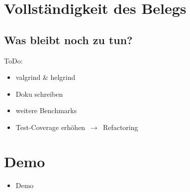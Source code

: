 \documentclass{beamer}
\begin{document}
\section{Vollständigkeit des Belegs}
\subsection{Was bleibt noch zu tun?}
\begin{frame}
ToDo:
\begin{itemize}
  \item valgrind \& helgrind
  \item Doku schreiben
  \item weitere Benchmarks
  \item Test-Coverage erhöhen $\,\to\,$ Refactoring
\end{itemize}
\end{frame}

\section{Demo}
\begin{frame}
  \begin{itemize}
    \item Demo
  \end{itemize}
\end{frame}
\end{document}
